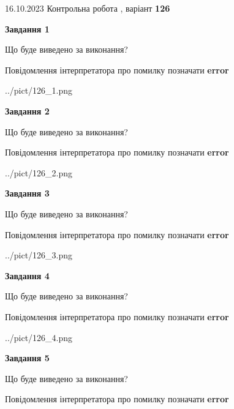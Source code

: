 \documentclass[12pt, ukrainian]{article}
\begin{document}
{\Large{16.10.2023 Контрольна робота , варіант  \No \textbf { 126 }\par}}
{
\begin {large}
{\begin {center}\textbf{Завдання 1}\end {center}}\par
Що буде виведено за виконання? \par
Повідомлення інтерпретатора про помилку позначати \textbf{error}

\begin{center}
	{../pict/126_1.png}
\end{center}
\newpage

{\begin {center}\textbf{Завдання 2}\end {center}}\par
Що буде виведено за виконання? \par
Повідомлення інтерпретатора про помилку позначати \textbf{error}

\begin{center}
	{../pict/126_2.png}
\end{center}
\newpage

{\begin {center}\textbf{Завдання 3}\end {center}}\par
Що буде виведено за виконання? \par
Повідомлення інтерпретатора про помилку позначати \textbf{error}

\begin{center}
	{../pict/126_3.png}
\end{center}
\newpage

{\begin {center}\textbf{Завдання 4}\end {center}}\par
Що буде виведено за виконання? \par
Повідомлення інтерпретатора про помилку позначати \textbf{error}

\begin{center}
	{../pict/126_4.png}
\end{center}
\newpage

{\begin {center}\textbf{Завдання 5}\end {center}}\par
Що буде виведено за виконання? \par
Повідомлення інтерпретатора про помилку позначати \textbf{error}


\end{large}}
\end{document}
